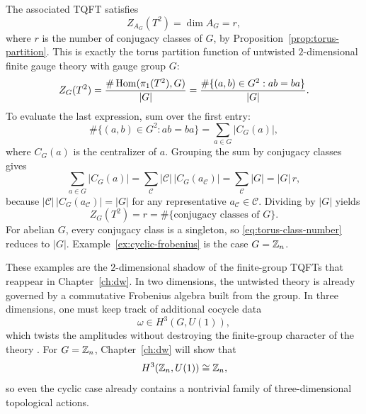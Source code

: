 \begin{remark}\label{rem:ZG-torus}
The associated TQFT satisfies
\begin{equation}\label{eq:ZG-torus}
Z_{A_G}(T^2)=\dim A_G=r,
\end{equation}
where $r$ is the number of conjugacy classes of $G$, by Proposition~\ref{prop:torus-partition}. This is exactly the torus partition function of untwisted $2$-dimensional finite gauge theory with gauge group $G$:
\begin{equation}\label{eq:DW-torus-count}
Z_G(T^2)
=
\frac{\#\operatorname{Hom}(\pi_1(T^2),G)}{|G|}
=
\frac{\#\{(a,b)\in G^2 : ab=ba\}}{|G|}.
\end{equation}
To evaluate the last expression, sum over the first entry:
\begin{equation}\label{eq:commuting-pairs}
\#\{(a,b)\in G^2 : ab=ba\}
=
\sum_{a \in G} |C_G(a)|,
\end{equation}
where $C_G(a)$ is the centralizer of $a$. Grouping the sum by conjugacy classes gives
\begin{equation}\label{eq:commuting-pairs-by-class}
\sum_{a \in G} |C_G(a)|
=
\sum_{\mathcal{C}} |\mathcal{C}|\, |C_G(a_{\mathcal{C}})|
=
\sum_{\mathcal{C}} |G|
=
|G|\, r,
\end{equation}
because $|\mathcal{C}|\, |C_G(a_{\mathcal{C}})| = |G|$ for any representative $a_{\mathcal{C}} \in \mathcal{C}$. Dividing by $|G|$ yields
\begin{equation}\label{eq:torus-class-number}
Z_G(T^2)=r=\#\{\text{conjugacy classes of }G\}.
\end{equation}
For abelian $G$, every conjugacy class is a singleton, so \eqref{eq:torus-class-number} reduces to $|G|$. Example~\ref{ex:cyclic-frobenius} is the case $G=\mathbb{Z}_n$.
\end{remark}

\begin{remark}\label{rem:foreshadow-dw}
These examples are the $2$-dimensional shadow of the finite-group TQFTs that reappear in Chapter~\ref{ch:dw}. In two dimensions, the untwisted theory is already governed by a commutative Frobenius algebra built from the group. In three dimensions, one must keep track of additional cocycle data
\begin{equation}\label{eq:dw-cocycle-foreshadow}
\omega \in H^3(G,U(1)),
\end{equation}
which twists the amplitudes without destroying the finite-group character of the theory \cite{DijkgraafWitten1990}. For $G=\mathbb{Z}_n$, Chapter~\ref{ch:dw} will show that
\begin{equation}\label{eq:H3-Zn-foreshadow}
H^3(\mathbb{Z}_n,U(1)) \cong \mathbb{Z}_n,
\end{equation}
so even the cyclic case already contains a nontrivial family of three-dimensional topological actions.
\end{remark}

